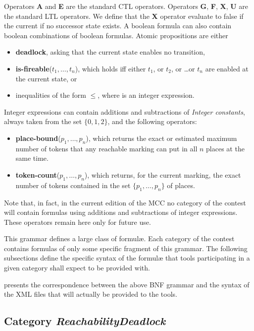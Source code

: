 \documentclass[10pt,english,a4paper]{article}
\newcommand\set[1]           {{\{ #1 \mathclose \}}}
\newcommand\ctla             {\textbf{A}\xspace}
\newcommand\ctle             {\textbf{E}\xspace}
\newcommand\ltlf             {\textbf{F}\xspace}
\newcommand\ltlg             {\textbf{G}\xspace}
\newcommand\ltlx             {\textbf{X}\xspace}
\newcommand\ltlu             {\textbf{U}\xspace}
\newcommand\atomleq          {\boldmath$\leq$\xspace}
\newcommand\atomdead         {\textbf{deadlock}\xspace}
\newcommand\atomisfire[1]    {\textbf{is-fireable}(#1)}
\newcommand\atomplacebnd[1]  {\textbf{place-bound}(#1)}
\newcommand\atomtokenscnt[1] {\textbf{token-count}(#1)}
\newcommand{\mcc}[0]{MCC}
\begin{document}
Operators \ctla and \ctle are the standard CTL operators.
Operators
\ltlg,
\ltlf,
\ltlx,
\ltlu
are the standard LTL operators.
We define that the \ltlx operator evaluate to false if the current if no
successor state exists.
A boolean formula can also contain boolean combinations of boolean
formulas.
Atomic propositions are either
\begin{itemize}
\item
  \atomdead, asking that the current state enables no transition,
\item
  \atomisfire{$t_1, \ldots, t_n$}, which holds iff either $t_1$, or $t_2$,
  or \ldots or $t_n$ are enabled at the current state, or
\item
  inequalities of the form  \atomleq {},
  where  is an integer expression.
\end{itemize}

Integer expressions can contain additions and subtractions of
\emph{Integer constants}, always taken from the set $\set{0, 1, 2}$, and
the following operators:
\begin{itemize}
\item
  \atomplacebnd{$p_1, \ldots, p_n$}, which returns the exact or estimated
  maximum number of tokens that any reachable marking can put in all $n$
  places at the same time.
\item
  \atomtokenscnt{$p_1, \ldots, p_n$}, which returns, for the current
  marking, the exact number of tokens contained in the set
  $\set{p_1, \ldots, p_n}$ of places.
\end{itemize}
Note that, in fact, in the current edition of the \mcc{} no category of the
contest will contain formulas using additions and subtractions of integer
expressions. These operators remain here only for future use.


This grammar defines a large class of formulæ.
Each category of the contest contains formulas of only some specific
fragment of this grammar.
The following subsections define the specific syntax of the formul\ae{}
that tools participating in a given category shall expect to be provided
with.

 presents the correspondence between the above BNF grammar
and the syntax of the XML files that will actually be provided to the tools.

\subsection{Category \textit{ReachabilityDeadlock}}
\end{document}
